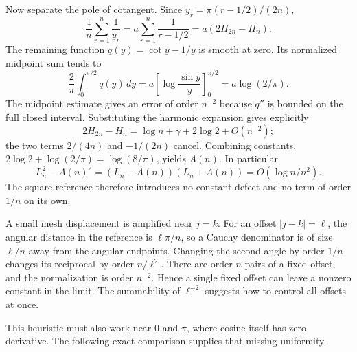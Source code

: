 Now separate the pole of cotangent. Since
$y_r=\pi(r-1/2)/(2n)$,
\[
 \frac1n\sum_{r=1}^n\frac1{y_r}
 =a\sum_{r=1}^n\frac1{r-1/2}
 =a(2H_{2n}-H_n).
\]
The remaining function $q(y)=\cot y-1/y$ is smooth at zero.
Its normalized midpoint sum tends to
\[
 \frac2\pi\int_0^{\pi/2}q(y)\,dy
 =a\left[\log\frac{\sin y}{y}\right]_{0}^{\pi/2}
 =a\log(2/\pi).
\]
The midpoint estimate gives an error of order $n^{-2}$ because
$q''$ is bounded on the full closed interval. Substituting the
harmonic expansion gives explicitly
\[
 2H_{2n}-H_n
 =\log n+\gamma+2\log2+O(n^{-2});
\]
the two terms $2/(4n)$ and $-1/(2n)$ cancel. Combining constants,
$2\log2+\log(2/\pi)=\log(8/\pi)$, yields $A(n)$.
In particular
\[
 L_n^2-A(n)^2=(L_n-A(n))(L_n+A(n))
                   =O(\log n/n^2).
\]
The square reference therefore introduces no constant defect and no
term of order $1/n$ on its own.

A small mesh displacement is amplified near $j=k$.
For an offset $|j-k|=\ell$, the angular distance in the reference
is $\ell\pi/n$, so a Cauchy denominator is of size $\ell/n$
away from the angular endpoints. Changing the second angle by
order $1/n$ changes its reciprocal by order $n/\ell^2$.
There are order $n$ pairs of a fixed offset, and the normalization
is order $n^{-2}$. Hence a single fixed offset can leave a nonzero
constant in the limit. The summability of $\ell^{-2}$ suggests
how to control all offsets at once.

This heuristic must also work near $0$ and $\pi$, where cosine
itself has zero derivative. The following exact comparison supplies
that missing uniformity.

